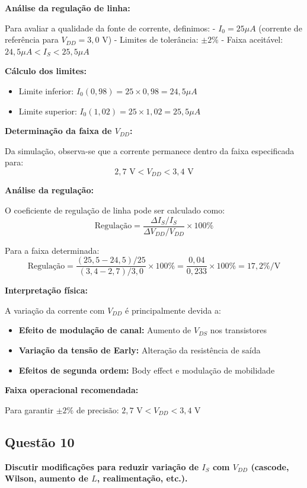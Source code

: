 \documentclass[12pt,a4paper]{article}
\begin{document}
\t\textbf{Análise da regulação de linha:}

Para avaliar a qualidade da fonte de corrente, definimos:
- $I_0 = 25 \mu A$ (corrente de referência para $V_{DD} = 3,0$ V)
- Limites de tolerância: $\pm 2\%$
- Faixa aceitável: $24,5 \mu A < I_S < 25,5 \mu A$

\t\textbf{Cálculo dos limites:}
\begin{itemize}
    \item Limite inferior: $I_0(0,98) = 25 \times 0,98 = 24,5 \mu A$
    \item Limite superior: $I_0(1,02) = 25 \times 1,02 = 25,5 \mu A$
\end{itemize}

\t\textbf{Determinação da faixa de $V_{DD}$:}

Da simulação, observa-se que a corrente permanece dentro da faixa especificada para:
$$2,7 \text{ V} < V_{DD} < 3,4 \text{ V}$$

\t\textbf{Análise da regulação:}

O coeficiente de regulação de linha pode ser calculado como:
$$\text{Regulação} = \frac{\Delta I_S / I_S}{\Delta V_{DD} / V_{DD}} \times 100\% $$

Para a faixa determinada:
$$\text{Regulação} = \frac{(25,5-24,5)/25}{(3,4-2,7)/3,0} \times 100\% = \frac{0,04}{0,233} \times 100\% = 17,2\%/\text{V}$$

\t\textbf{Interpretação física:}

A variação da corrente com $V_{DD}$ é principalmente devida a:
\begin{itemize}
    \item \t\textbf{Efeito de modulação de canal:} Aumento de $V_{DS}$ nos transistores
    \item \t\textbf{Variação da tensão de Early:} Alteração da resistência de saída
    \item \t\textbf{Efeitos de segunda ordem:} Body effect e modulação de mobilidade
\end{itemize}

\t\textbf{Faixa operacional recomendada:}

Para garantir $\pm 2\%$ de precisão: $\boxed{2,7 \text{ V} < V_{DD} < 3,4 \text{ V}}$

\subsection*{Questão 10}
	\textbf{Discutir modificações para reduzir variação de $I_S$ com $V_{DD}$ (cascode, Wilson, aumento de $L$, realimentação, etc.).}
\end{document}
